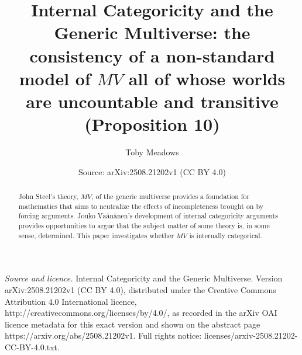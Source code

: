\documentclass[10pt,a4paper]{amsart}
\title[Internal Categoricity and the Generic Multiverse]{Internal Categoricity and the Generic Multiverse: the consistency of a non-standard model of $MV$ all of whose worlds are uncountable and transitive (Proposition 10)}
\author{Toby Meadows}
\date{Source: arXiv:2508.21202v1 (CC BY 4.0)}
\numberwithin{equation}{section}
\numberwithin{figure}{section}
\theoremstyle{plain}
\theoremstyle{plain}
\theoremstyle{plain}
\theoremstyle{plain}
\theoremstyle{remark}
\theoremstyle{plain}
\theoremstyle{definition}
\begin{document}
\begin{abstract}
John Steel's theory, $MV$, of the generic multiverse provides a foundation
for mathematics that aims to neutralize the effects of incompleteness
brought on by forcing arguments. Jouko V\"{a}\"{a}n\"{a}nen's development of internal
categoricity arguments provides opportunities to argue that the subject
matter of some theory is, in some sense, determined. This paper investigates
whether $MV$ is internally categorical.
\end{abstract}
\maketitle
\noindent\emph{Source and licence.} Internal Categoricity and the Generic Multiverse. Version arXiv:2508.21202v1 (CC BY 4.0), distributed under the Creative Commons Attribution 4.0 International licence, http://creativecommons.org/licenses/by/4.0/, as recorded in the arXiv OAI licence metadata for this exact version and shown on the abstract page https://arxiv.org/abs/2508.21202v1. Full rights notice: licenses/arxiv-2508.21202-CC-BY-4.0.txt.\par\smallskip
\end{document}
